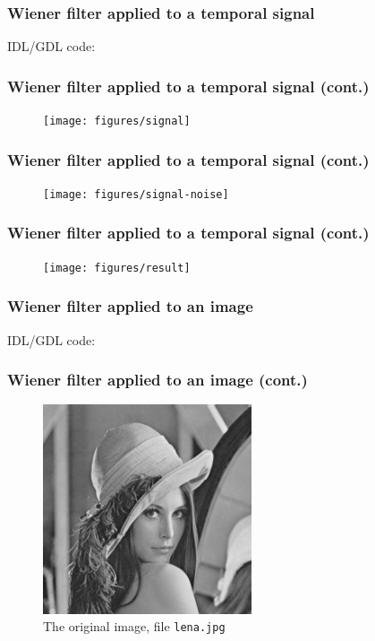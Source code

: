 \documentclass[10pt]{beamer}
\begin{document}
\begin{frame}
  \frametitle{Wiener filter applied to a temporal signal}
  IDL/GDL code:
  
\end{frame}

\begin{frame}
  \frametitle{Wiener filter applied to a temporal signal (cont.)}
  \begin{figure}
    \centering
    \texttt{[image: figures/signal]}
  \end{figure}
\end{frame}

\begin{frame}
  \frametitle{Wiener filter applied to a temporal signal (cont.)}
  \begin{figure}
    \centering
    \texttt{[image: figures/signal-noise]}
  \end{figure}
\end{frame}

\begin{frame}
  \frametitle{Wiener filter applied to a temporal signal (cont.)}
  \begin{figure}
    \centering
    \texttt{[image: figures/result]}
  \end{figure}
\end{frame}

\begin{frame}
  \frametitle{Wiener filter applied to an image}
  IDL/GDL code:
  
\end{frame}

\begin{frame}
  \frametitle{Wiener filter applied to an image (cont.)}
  \begin{figure}
    \centering
    \includegraphics[width=0.55\textwidth]{lena}
    \caption{The original image, file \texttt{lena.jpg}}
  \end{figure}
\end{frame}
\end{document}
